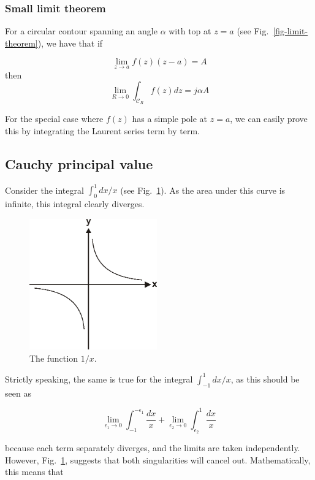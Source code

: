 \subsubsection{Small limit theorem} 

For a circular contour spanning an angle $\alpha$ with top at $z=a$ (see
Fig.~\ref{fig-limit-theorem}), we have that if

\begin{equation}
\lim_{z \to a}  f(z) (z-a) = A
\end{equation}
then
\begin{equation}
\lim_{R \to 0} \int_{\mathcal{C}_R} f(z) dz = j \alpha A
\end{equation}

For the special case where $f(z)$ has a simple pole at $z=a$, we can easily
prove this by integrating the Laurent series term by term.

\subsection{Cauchy principal value}

Consider the integral $\int_0^1 dx / x$ (see Fig.~\ref{fig-pv}). As the area
under this curve is infinite, this integral clearly diverges.

\begin{figure}
\centering
\includegraphics[width=5.5cm]{complex/figures/pv}
\caption{The function $1/x$.}
\label{fig-pv}
\end{figure}

Strictly speaking, the same is true for the integral $\int_{-1}^1 dx / x$, as
this should be seen as

\begin{equation}
\lim_{\epsilon_1 \to 0} \int_{-1}^{-\epsilon_1} \frac{dx}{x} + \lim_{\epsilon_2
\to 0} \int_{\epsilon_2}^1 \frac{dx}{x}
\end{equation}  

because each term separately diverges, and the limits are taken independently.
However, Fig.~\ref{fig-pv}, suggests that both singularities will cancel out.
Mathematically, this means that

